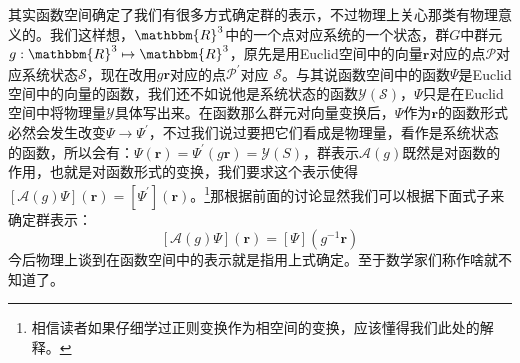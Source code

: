 其实函数空间确定了我们有很多方式确定群的表示，不过物理上关心那类有物理意义的。我们这样想，$\mathbbm{R}^3$中的一个点对应系统的一个状态，群$G$中群元$g:\mathbbm{R}^3\mapsto\mathbbm{R}^3$，原先是用Euclid空间中的向量$\mathbf{r}$对应的点$\mathcal{P}$对应系统状态$\mathcal{S}$，现在改用$g\mathbf{r}$对应的点$\mathcal{P}^\prime$对应
$\mathcal{S}$。与其说函数空间中的函数$\Psi$是Euclid空间中的向量的函数，我们还不如说他是系统状态的函数$\mathscr{Y}(\mathcal{S})$，$\Psi$只是在Euclid空间中将物理量$\mathscr{Y}$具体写出来。在函数那么群元对向量变换后，$\Psi$作为$\mathbf{r}$的函数形式必然会发生改变$\Psi\to\Psi^\prime$，不过我们说过要把它们看成是物理量，看作是系统状态的函数，所以会有：$\Psi(\mathbf{r})=\Psi^\prime(g\mathbf{r})=\mathscr{Y}(S)$，群表示$\mathscr{A}(g)$既然是对函数的作用，也就是对函数形式的变换，我们要求这个表示使得$[\mathscr{A}(g)\Psi](\mathbf{r})=[\Psi^\prime](\mathbf{r})$。\footnote{相信读者如果仔细学过正则变换作为相空间的变换，应该懂得我们此处的解释。}那根据前面的讨论显然我们可以根据下面式子来确定群表示：
\begin{equation}
	\boxed{[\mathscr{A}(g)\Psi](\mathbf{r})=[\Psi](g^{-1}\mathbf{r})}
\end{equation}
今后物理上谈到在函数空间中的表示就是指用上式确定。至于数学家们称作啥就不知道了。
